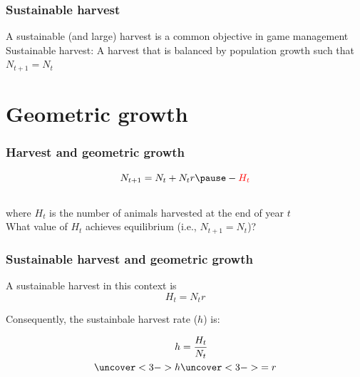 \documentclass[color=usenames,dvipsnames,handout]{beamer}\usepackage[]{graphicx}\usepackage[]{color}
\begin{document}










\begin{frame}
  \frametitle{Sustainable harvest}
  \large
  {%
    A sustainable (and large) harvest is a common
    objective in game management}
  \vfill
  \pause
  {%
    Sustainable harvest:}
    A harvest that is balanced by population growth such that $N_{t+1}
    = N_t$
\end{frame}





\section{Geometric growth}




\begin{frame}
  \frametitle{Harvest and geometric growth}
  \Large
  \[
   N_{t+1} = N_t + N_tr \pause - \color{red}{H_t}
  \] \\
  \pause
  \large
  where $H_t$ is the number of animals harvested at the end of year $t$ \\
  \pause
  \vfill %
  What value of $H_t$ achieves equilibrium (i.e., $N_{t+1} = N_t$)?  \\
\end{frame}




\begin{frame}
  \frametitle{Sustainable harvest and geometric growth}
  \large
  A sustainable harvest in this context is
  \LARGE
  \[
    H_t = N_tr
  \]
  \pause
  \large
  \vfill
  {%
    Consequently, the sustainbale harvest rate ($h$) is: \par}
  \LARGE
  \begin{align*}
    h &= \frac{H_t}{N_t} \\
    \uncover<3->{h}  &\uncover<3->{= r} \\
  \end{align*}
\end{frame}
\end{document}
